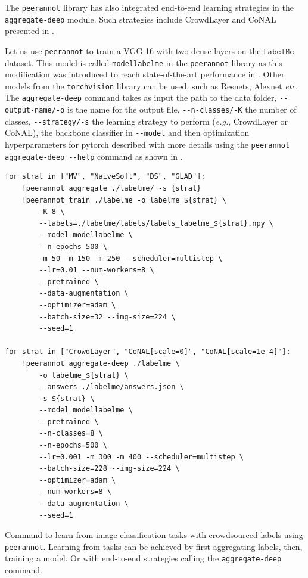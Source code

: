 The \texttt{peerannot} library has also integrated end-to-end learning strategies in the \texttt{aggregate-deep} module.
Such strategies include CrowdLayer and CoNAL presented in .

Let us use \texttt{peerannot} to train a VGG-16 with two dense layers on the $\texttt{LabelMe}$ dataset. This model is called \texttt{modellabelme} in the \texttt{peerannot} library as this modification was introduced to reach state-of-the-art performance in \citet{chu2021learning}.
Other models from the \texttt{torchvision} library can be used, such as Resnets, Alexnet \emph{etc.}
The \texttt{aggregate-deep} command takes as input the path to the data folder, \texttt{-{}-output-name/-o} is the name for the output file, \texttt{-{}-n-classes/-K} the number of classes, \texttt{-{}-strategy/-s} the learning strategy to perform (\emph{e.g.}, CrowdLayer or CoNAL), the backbone classifier in \texttt{-{}-model} and then optimization hyperparameters for pytorch described with more details using the \texttt{peerannot aggregate-deep -{}-help} command as shown in .

\begin{listing}[H]
    \begin{verbatim}
for strat in ["MV", "NaiveSoft", "DS", "GLAD"]:
    !peerannot aggregate ./labelme/ -s {strat}
    !peerannot train ./labelme -o labelme_${strat} \
        -K 8 \
        --labels=./labelme/labels/labels_labelme_${strat}.npy \
        --model modellabelme \
        --n-epochs 500 \
        -m 50 -m 150 -m 250 --scheduler=multistep \
        --lr=0.01 --num-workers=8 \
        --pretrained \
        --data-augmentation \
        --optimizer=adam \
        --batch-size=32 --img-size=224 \
        --seed=1

for strat in ["CrowdLayer", "CoNAL[scale=0]", "CoNAL[scale=1e-4]"]:
    !peerannot aggregate-deep ./labelme \
        -o labelme_${strat} \
        --answers ./labelme/answers.json \
        -s ${strat} \
        --model modellabelme \
        --pretrained \
        --n-classes=8 \
        --n-epochs=500 \
        --lr=0.001 -m 300 -m 400 --scheduler=multistep \
        --batch-size=228 --img-size=224 \
        --optimizer=adam \
        --num-workers=8 \
        --data-augmentation \
        --seed=1
    \end{verbatim}
    \caption{Command to learn from image classification tasks with crowdsourced labels using \texttt{peerannot}. Learning from tasks can be achieved by first aggregating labels, then, training a model. Or with end-to-end strategies calling the \texttt{aggregate-deep} command.}
    \label{lst:learning_peerannot}
\end{listing}

